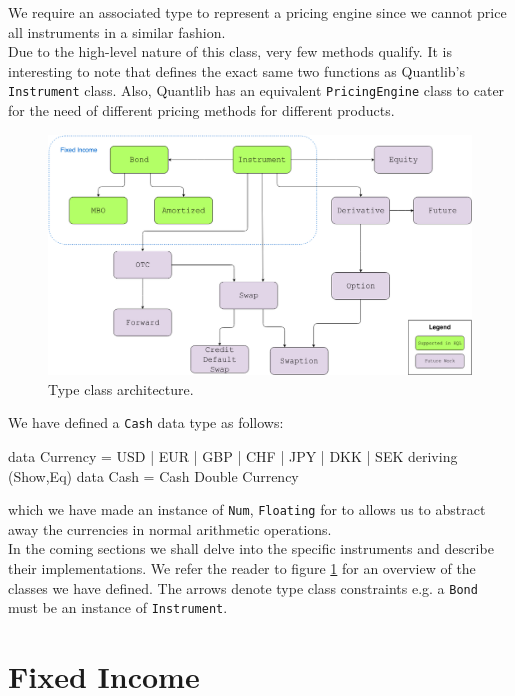 We require an associated type to represent a pricing engine since we
cannot price all instruments in a similar fashion.\\
Due to the high-level nature of this class, very few methods qualify.
It is interesting to note that \hql defines the
exact same two functions as Quantlib's \texttt{Instrument}
class\cite{implql}. Also, Quantlib has an equivalent \texttt{PricingEngine}
class to cater for the need of different pricing methods for different
products.\\

\begin{figure}[!h]
\centering
\includegraphics[scale=.3]{images/classhier.png}
\caption{Type class architecture.}
\label{fig:classhier}
\end{figure}

We have defined a \texttt{Cash} data type as follows:

\begin{hscode}
data Currency = USD | EUR | GBP | CHF | JPY | DKK | SEK deriving (Show,Eq)
data Cash = Cash Double Currency
\end{hscode}

which we have made an instance of \texttt{Num}, \texttt{Floating} for to
allows us to abstract away the currencies in normal arithmetic operations.\\

In the coming sections we shall delve into the specific instruments and
describe their implementations. We refer the reader to figure \ref{fig:classhier}
for an overview of the classes we have defined. The arrows denote type class
constraints e.g. a \texttt{Bond} must be an instance of \texttt{Instrument}.

\section{Fixed Income}\label{sec:fi}

